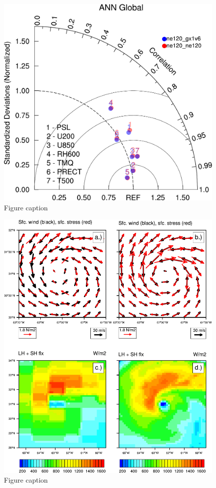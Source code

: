 \documentclass[draft,ms]{AGUTeX}
\begin{document}

\newpage

\begin{figure}
\includegraphics[width=0.7\linewidth]{taylor_globe_ANN.pdf}
\caption{Figure caption}
\label{fig:taylor_global}
\end{figure}


\begin{figure}
\includegraphics[width=0.8\linewidth]{fig_compareStress.pdf}
\caption{Figure caption}
\label{fig:forecast_panels}
\end{figure}

\end{document}
